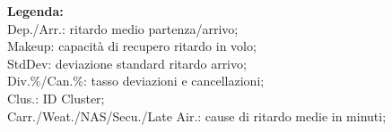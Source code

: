 \documentclass[conference]{IEEEtran}
\begin{document}
\centering
\textbf{Legenda:}\\
Dep./Arr.: ritardo medio partenza/arrivo;
\\Makeup: capacità di recupero ritardo in volo;
\\StdDev: deviazione standard ritardo arrivo;
\\Div.\%/Can.\%: tasso deviazioni e cancellazioni;
\\Clus.: ID Cluster;
\\Carr./Weat./NAS/Secu./Late Air.: cause di ritardo medie in minuti;
\end{document}
